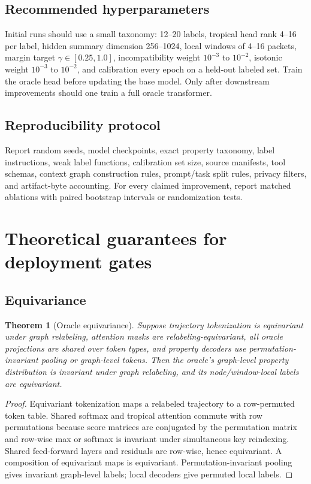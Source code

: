 \documentclass[11pt]{article}
\newtheorem{theorem}{Theorem}[section]
\theoremstyle{definition}
\theoremstyle{remark}
\numberwithin{equation}{section}
\begin{document}
\subsection{Recommended hyperparameters}

Initial runs should use a small taxonomy: 12--20 labels, tropical head rank 4--16 per label, hidden summary dimension 256--1024, local windows of 4--16 packets, margin target \(\gamma\in[0.25,1.0]\), incompatibility weight \(10^{-3}\) to \(10^{-2}\), isotonic weight \(10^{-3}\) to \(10^{-2}\), and calibration every epoch on a held-out labeled set.  Train the oracle head before updating the base model.  Only after downstream improvements should one train a full oracle transformer.

\subsection{Reproducibility protocol}

Report random seeds, model checkpoints, exact property taxonomy, label instructions, weak label functions, calibration set size, source manifests, tool schemas, context graph construction rules, prompt/task split rules, privacy filters, and artifact-byte accounting.  For every claimed improvement, report matched ablations with paired bootstrap intervals or randomization tests.

\section{Theoretical guarantees for deployment gates}

\subsection{Equivariance}

\begin{theorem}[Oracle equivariance]
Suppose trajectory tokenization is equivariant under graph relabeling, attention masks are relabeling-equivariant, all oracle projections are shared over token types, and property decoders use permutation-invariant pooling or graph-level tokens.  Then the oracle's graph-level property distribution is invariant under graph relabeling, and its node/window-local labels are equivariant.
\end{theorem}
\begin{proof}
Equivariant tokenization maps a relabeled trajectory to a row-permuted token table.  Shared softmax and tropical attention commute with row permutations because score matrices are conjugated by the permutation matrix and row-wise max or softmax is invariant under simultaneous key reindexing.  Shared feed-forward layers and residuals are row-wise, hence equivariant.  A composition of equivariant maps is equivariant.  Permutation-invariant pooling gives invariant graph-level labels; local decoders give permuted local labels.
\end{proof}
\end{document}
